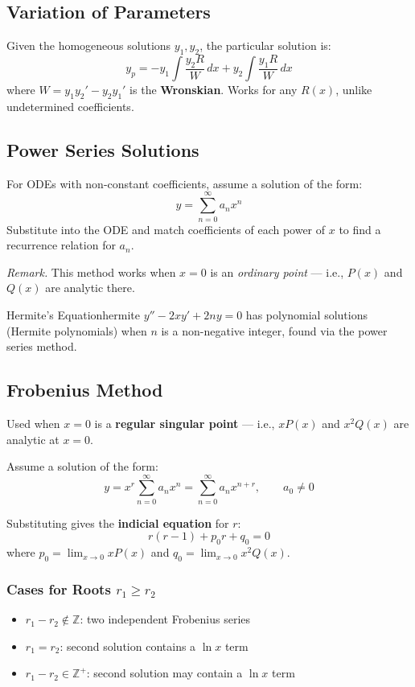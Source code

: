 \documentclass[11pt, letterpaper]{article}
\theoremstyle{plain}
\newenvironment{remark}{\smallskip\noindent\textit{Remark.}}{\smallskip}
\begin{document}
\subsection{Variation of Parameters}

Given the homogeneous solutions $y_1, y_2$, the particular solution is:
\[
    y_p = -y_1 \int \frac{y_2 R}{W}\,dx + y_2 \int \frac{y_1 R}{W}\,dx
\]
where $W = y_1 y_2' - y_2 y_1'$ is the \textbf{Wronskian}. Works for any $R(x)$,
unlike undetermined coefficients.


\subsection{Power Series Solutions}

For ODEs with non-constant coefficients, assume a solution of the form:
\[
    y = \sum_{n=0}^{\infty} a_n x^n
\]
Substitute into the ODE and match coefficients of each power of $x$ to find
a recurrence relation for $a_n$.

\begin{remark}
    This method works when $x = 0$ is an \emph{ordinary point} — i.e.,
    $P(x)$ and $Q(x)$ are analytic there.
\end{remark}

\begin{example}{Hermite's Equation}{hermite}
    $y'' - 2xy' + 2ny = 0$ has polynomial solutions (Hermite polynomials)
    when $n$ is a non-negative integer, found via the power series method.
\end{example}


\subsection{Frobenius Method}

Used when $x = 0$ is a \textbf{regular singular point} — i.e., $xP(x)$
and $x^2Q(x)$ are analytic at $x = 0$.

Assume a solution of the form:
\[
    y = x^r \sum_{n=0}^{\infty} a_n x^n = \sum_{n=0}^{\infty} a_n x^{n+r},
    \qquad a_0 \neq 0
\]

Substituting gives the \textbf{indicial equation} for $r$:
\[
    r(r-1) + p_0 r + q_0 = 0
\]
where $p_0 = \lim_{x\to 0} xP(x)$ and $q_0 = \lim_{x\to 0} x^2Q(x)$.

\subsubsection*{Cases for Roots $r_1 \geq r_2$}
\begin{itemize}
    \item $r_1 - r_2 \notin \mathbb{Z}$: two independent Frobenius series
    \item $r_1 = r_2$: second solution contains a $\ln x$ term
    \item $r_1 - r_2 \in \mathbb{Z}^+$: second solution may contain a $\ln x$ term
\end{itemize}
\end{document}
